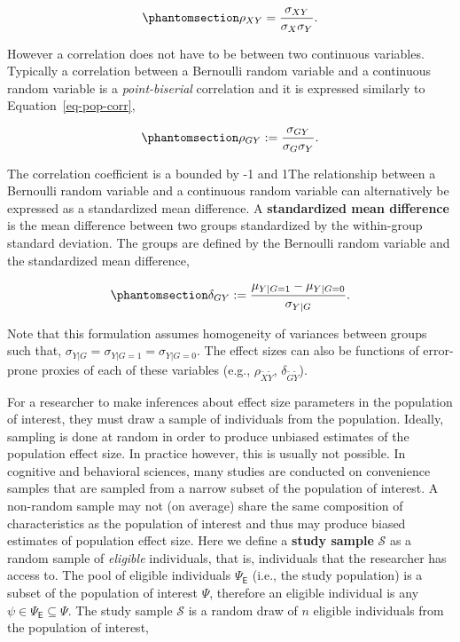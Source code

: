 \documentclass[
  letterpaper,
  DIV=11,
  numbers=noendperiod]{scrreprt}
\begin{document}
\begin{equation}\phantomsection\label{eq-pop-corr}{
\rho_{XY} = \frac{\sigma_{XY}}{\sigma_X\sigma_Y}.
}\end{equation}

However a correlation does not have to be between two continuous
variables. Typically a correlation between a Bernoulli random variable
and a continuous random variable is a \emph{point-biserial} correlation
and it is expressed similarly to Equation~\ref{eq-pop-corr},

\begin{equation}\phantomsection\label{eq-pb-corr}{
\rho_{GY} := \frac{\sigma_{GY}}{\sigma_G\sigma_Y}.
}\end{equation}

The correlation coefficient is a bounded by -1 and 1The relationship
between a Bernoulli random variable and a continuous random variable can
alternatively be expressed as a standardized mean difference. A
\textbf{standardized mean difference} is the mean difference between two
groups standardized by the within-group standard deviation. The groups
are defined by the Bernoulli random variable and the standardized mean
difference,

\begin{equation}\phantomsection\label{eq-pop-smd}{
\delta_{GY} :=  \frac{\mu_{Y|G=1}-\mu_{Y|G=0}}{\sigma_{Y|G}}.
}\end{equation}

Note that this formulation assumes homogeneity of variances between
groups such that, \(\sigma_{Y|G}=\sigma_{Y|G=1}=\sigma_{Y|G=0}\). The
effect sizes can also be functions of error-prone proxies of each of
these variables (e.g., \(\rho_{\widetilde{X}\widetilde{Y}}\),
\(\delta_{\widetilde{G}\widetilde{Y}}\)).

For a researcher to make inferences about effect size parameters in the
population of interest, they must draw a sample of individuals from the
population. Ideally, sampling is done at random in order to produce
unbiased estimates of the population effect size. In practice however,
this is usually not possible. In cognitive and behavioral sciences, many
studies are conducted on convenience samples that are sampled from a
narrow subset of the population of interest. A non-random sample may not
(on average) share the same composition of characteristics as the
population of interest and thus may produce biased estimates of
population effect size. Here we define a \textbf{study sample}
\(\mathcal{S}\) as a random sample of \emph{eligible} individuals, that
is, individuals that the researcher has access to. The pool of eligible
individuals \(\Psi_\mathsf{E}\) (i.e., the study population) is a subset
of the population of interest \(\Psi\), therefore an eligible individual
is any \(\psi\in\Psi_\mathsf{E} \subseteq \Psi\). The study sample
\(\mathcal{S}\) is a random draw of \(n\) eligible individuals from the
population of interest,
\end{document}
